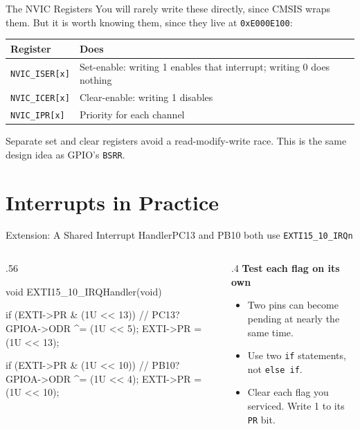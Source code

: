\documentclass[9pt,aspectratio=169,xcolor=table]{beamer}
\begin{document}
\begin{frame}{The NVIC Registers}
    \leavevmode
    {\small You will rarely write these directly, since CMSIS wraps
    them. But it is worth knowing them, since they live at
    \texttt{0xE000E100}:}

	\begin{center}
    {\small
	\striped
	\begin{tabular}{@{}l p{8cm}@{}}
		\toprule
		\textbf{Register} & \textbf{Does} \\
		\midrule
		\texttt{NVIC\_ISER[x]} & Set-enable: writing 1 enables that
		interrupt; writing 0 does nothing \\
		\texttt{NVIC\_ICER[x]} & Clear-enable: writing 1 disables \\
		\texttt{NVIC\_IPR[x]}  & Priority for each channel \\
		\bottomrule
	\end{tabular}}
	\end{center}

    {\small Separate set and clear registers avoid a read-modify-write
    race. \alert{This is the same design idea as GPIO's \texttt{BSRR}}.}
\end{frame}


\section{Interrupts in Practice}

\begin{frame}[fragile]{Extension: A Shared Interrupt Handler}{PC13 and PB10 both use \texttt{EXTI15\_10\_IRQn}}
    \begin{columns}[T]
    \begin{column}{.56\textwidth}
\begin{cc}[basicstyle=\ttfamily\footnotesize]
void EXTI15_10_IRQHandler(void) {
    if (EXTI->PR & (1U << 13)) { // PC13?
        GPIOA->ODR ^= (1U << 5);
        EXTI->PR = (1U << 13);
    }

    if (EXTI->PR & (1U << 10)) { // PB10?
        GPIOA->ODR ^= (1U << 4);
        EXTI->PR = (1U << 10);
    }
}
\end{cc}
    \end{column}
    \begin{column}{.4\textwidth}
        \textbf{Test each flag on its own}
        {\small
        \begin{itemize}\itemsep1pt
            \item Two pins can become pending at nearly the same time.
            \item Use two \texttt{if} statements, \alert{not} \texttt{else if}.
            \item Clear each flag you serviced. Write 1 to its \texttt{PR} bit.
        \end{itemize}}
    \end{column}
    \end{columns}
\end{frame}
\end{document}
